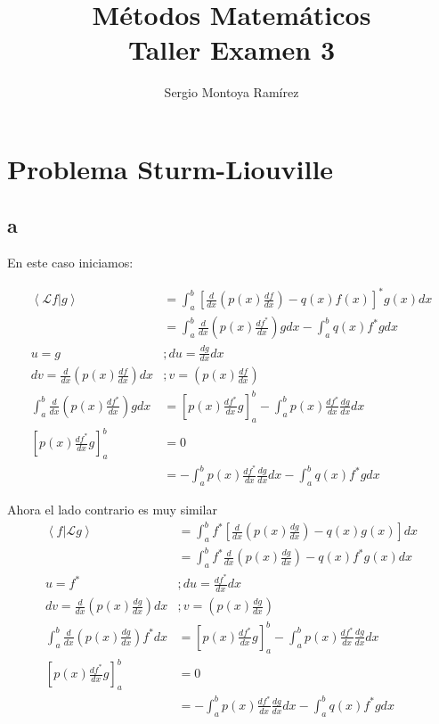 \documentclass{report}
\title{\Huge{Métodos Matemáticos}\\Taller Examen 3}
\author{\huge{Sergio Montoya Ramírez}}
\date{}
\newcommand{\Lagr}{\mathcal{L}}
\begin{document}
\maketitle
\newpage%
\tableofcontents
\pagebreak

\chapter{Problema Sturm-Liouville}

\section{a}
En este caso iniciamos:

\begin{align*}
\left<\Lagr f | g \right> &= \int_{a}^b \left[\frac{d}{dx}\left(p(x) \frac{df}{dx}\right) - q(x) f(x) \right]^*g(x)dx \\
&= \int_a^b \frac{d}{dx} \left(p(x) \frac{df^*}{dx}\right) g dx - \int_a^b q(x)f^*g dx\\
u = g &; du = \frac{dg}{dx} dx\\
dv = \frac{d}{dx}\left(p(x) \frac{df}{dx}\right) dx &; v = \left(p(x) \frac{df}{dx}\right)\\
\int_a^b \frac{d}{dx} \left(p(x) \frac{df^*}{dx}\right) g dx &= \left[p(x) \frac{df^*}{dx} g \right]_a^b - \int_a^b p(x) \frac{df^*}{dx} \frac{dg}{dx} dx\\
\left[p(x) \frac{df^*}{dx} g \right]_a^b &= 0\\
&= - \int_a^b p(x) \frac{df^*}{dx} \frac{dg}{dx} dx - \int_a^b q(x)f^*g dx
\end{align*}

Ahora el lado contrario es muy similar
\begin{align*}
\left< f | \Lagr g \right> &= \int_{a}^b f^* \left[\frac{d}{dx}\left(p(x) \frac{dg}{dx}\right) - q(x) g(x) \right]dx \\
&= \int_{a}^b f^* \frac{d}{dx}\left(p(x) \frac{dg}{dx}\right) - q(x)f^* g(x)dx \\
u = f^* &; du = \frac{df^*}{dx} dx\\
dv = \frac{d}{dx}\left(p(x) \frac{dg}{dx}\right) dx &; v = \left(p(x) \frac{dg}{dx}\right)\\
\int_a^b \frac{d}{dx} \left(p(x) \frac{dg}{dx}\right) f^* dx &= \left[p(x) \frac{df^*}{dx} g \right]_a^b - \int_a^b p(x) \frac{df^*}{dx} \frac{dg}{dx} dx\\
\left[p(x) \frac{df^*}{dx} g \right]_a^b &= 0\\
&= - \int_a^b p(x) \frac{df^*}{dx} \frac{dg}{dx} dx - \int_a^b q(x)f^*g dx
\end{align*}
\end{document}
